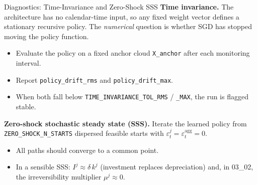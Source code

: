 \documentclass[aspectratio=169,11pt]{beamer}
\newcommand{\emphc}[1]{\textcolor{harvardcrimson}{#1}}
\begin{document}
\begin{frame}{Diagnostics: Time-Invariance and Zero-Shock SSS}
\textbf{Time invariance.}  The architecture has no calendar-time input, so any fixed weight vector defines a stationary recursive policy.  The \emph{numerical} question is whether SGD has stopped moving the policy function.

\vspace{0.2em}
\begin{itemize}
    \item Evaluate the policy on a fixed anchor cloud \texttt{X\_anchor} after each monitoring interval.
    \item Report \texttt{policy\_drift\_rms} and \texttt{policy\_drift\_max}.
    \item When both fall below \texttt{TIME\_INVARIANCE\_TOL\_RMS} / \texttt{\_MAX}, the run is flagged \emphc{stable}.
\end{itemize}

\vspace{0.3em}
\textbf{Zero-shock stochastic steady state (SSS).}  Iterate the learned policy from \texttt{ZERO\_SHOCK\_N\_STARTS} dispersed feasible starts with $\varepsilon^j_t = \varepsilon^{\mathrm{agg}}_t = 0$.

\vspace{0.2em}
\begin{itemize}
    \item All paths should converge to a common point.
    \item In a sensible SSS: $I^j \approx \delta\,k^j$ (investment replaces depreciation) and, in 03\_02, the irreversibility multiplier $\mu^j \approx 0$.
\end{itemize}
\end{frame}
\end{document}
